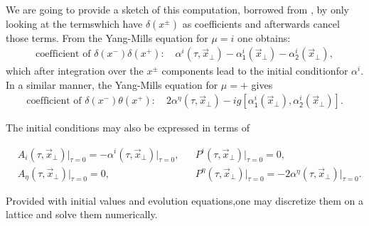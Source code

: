 \begin{note}
We are going to provide a sketch of this computation, borrowed from \cite{lappistages}, by only looking at the termswhich have $\delta(x^\pm)$ as coefficients and afterwards cancel those terms. From the Yang-Mills equation for $\mu=i$ one obtains:
\begin{align*}
    \text{coefficient of }\delta(x^-)\delta(x^+):\quad \alpha^i(\tau,\vec{x}_\perp)-\alpha_\textsf{1}^i(\vec{x}_\perp)-\alpha_\textsf{2}^i(\vec{x}_\perp),
\end{align*}
which after integration over the $x^\pm$ components lead to the initial conditionfor $\alpha^i$. In a similar manner, the Yang-Mills equation for $\mu=+$ gives
\begin{align*}
    \text{coefficient of }\delta(x^-)\theta(x^+):\quad 2\alpha^\eta(\tau,\vec{x}_\perp)-ig[\alpha_\textsf{1}^i(\vec{x}_\perp),\alpha_\textsf{2}^i(\vec{x}_\perp)].
\end{align*}
\end{note}

The initial conditions may also be expressed in terms of
\begin{fullwidth}
\begin{equation*}
    \begin{aligned}
        &A_i(\tau,\vec{x}_\perp)\Big|_{\tau=0}=-\alpha^i(\tau,\vec{x}_\perp)\Big|_{\tau=0}, && P^i(\tau,\vec{x}_\perp)\Big|_{\tau=0}=0,\\
        &A_\eta(\tau,\vec{x}_\perp)\Big|_{\tau=0}=0, && P^\eta(\tau,\vec{x}_\perp)\Big|_{\tau=0}=-2\alpha^\eta(\tau,\vec{x}_\perp)\Big|_{\tau=0}.
    \end{aligned}
\end{equation*}
\end{fullwidth}

Provided with initial values and evolution equations,one may discretize them on a lattice and solve them numerically.


